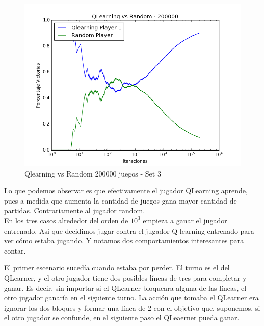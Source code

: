 \begin{figure}[h]
 \centering
 \begin{minipage}{.45\textwidth}
	\centering
	\includegraphics[scale=0.35]{img1/QlearningVsRandom_200000_6x5_cyntia.png}
        \caption{Qlearning vs Random 200000 juegos - Set 3}
  \end{minipage}
\end{figure}

 

Lo que podemos observar es que efectivamente el jugador QLearning aprende, pues a medida que aumenta la cantidad de juegos gana mayor cantidad de partidas. Contrariamente al jugador random.  \\

En los tres casos alrededor del orden de $10^{3}$ empieza a ganar el jugador entrenado. 
Asi que decidimos jugar contra el jugador Q-learning entrenado para ver c\'omo estaba jugando. Y notamos dos comportamientos interesantes para contar.

El primer escenario suced\'ia cuando estaba por perder. El turno es el del QLearner, y el otro jugador tiene dos posibles l\'ineas de tres para completar y ganar. Es decir, sin importar si el QLearner bloqueara alguna de las l\'ineas, el otro jugador ganar\'ia en el siguiente turno. La acci\'on que tomaba el QLearner era ignorar los dos bloques y formar una l\'inea de 2 con el objetivo que, suponemos, si el otro jugador se confunde, en el siguiente paso el QLeaerner pueda ganar.  

